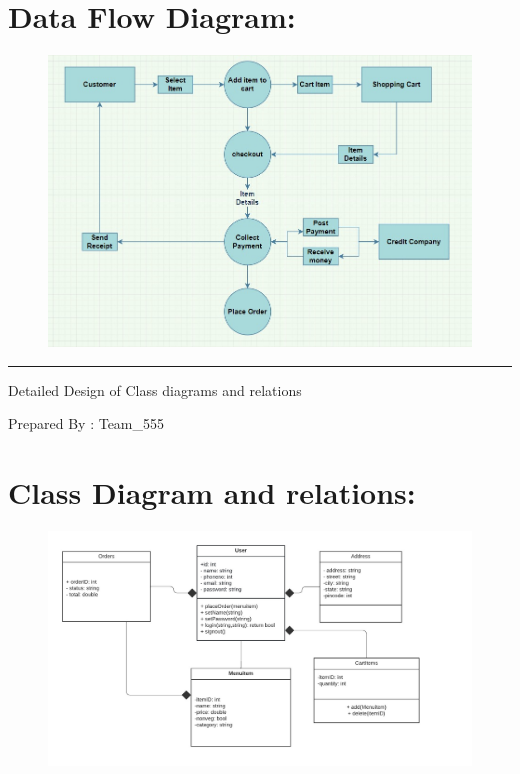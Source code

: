 \documentclass{scrreprt}
\begin{document}
\section*{Data Flow Diagram:}
\vspace{20pt}
\begin{figure}[h!]
\begin{center}
    \includegraphics[scale=0.5]{Dataflow.jpeg}
\end{center}
\end{figure}
\newpage
\begin{flushright}
    \rule{16cm}{5pt}\vskip1cm
    \begin{bfseries}
        \Huge{Detailed Design of Class diagrams and relations}\\
        \vspace{1.5cm}
        \vspace{2.5cm}
        
        \vspace{1.5cm}
     {Prepared By : Team_555}
        \vspace{1.5cm}
        \vspace{1.5cm}
        
    \end{bfseries}
\end{flushright}
\newpage
\section*{Class Diagram and relations:}
\vspace{20pt}
\begin{figure}[h!]
    \centering
    \includegraphics[scale=0.8]{UML class.jpeg}
    
\end{figure}
\newpage
\end{document}
